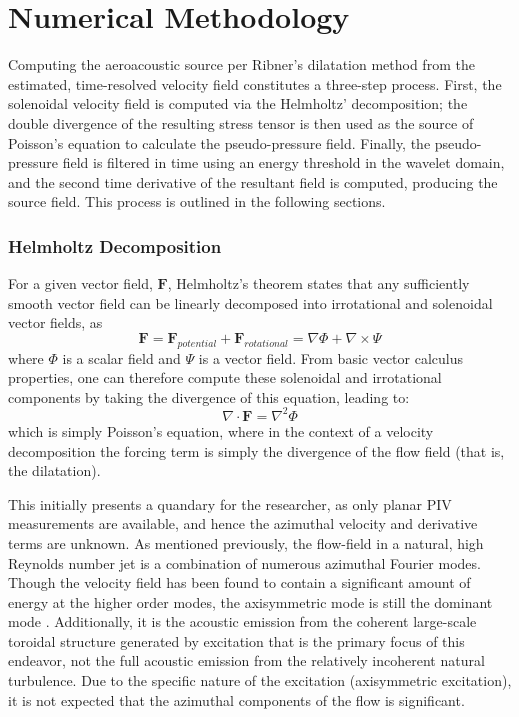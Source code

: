 \section{Numerical Methodology}
Computing the aeroacoustic source per Ribner's dilatation method from the estimated, time-resolved velocity field constitutes a three-step process. 
First, the solenoidal velocity field is computed via the Helmholtz' decomposition; the double divergence of the resulting stress tensor is then used as the source of Poisson's equation to calculate the pseudo-pressure field. 
Finally, the pseudo-pressure field is filtered in time using an energy threshold in the wavelet domain, and the second time derivative of the resultant field is computed, producing the source field.
This process is outlined in the following sections.
\subsubsection{Helmholtz Decomposition}
For a given vector field, $\mathbf{F}$, Helmholtz's theorem states that any sufficiently smooth vector field can be linearly decomposed into irrotational and solenoidal vector fields, as
\begin{equation}
\mathbf{F} = \mathbf{F}_{potential} + \mathbf{F}_{rotational} = \nabla \Phi + \nabla \times \Psi
\end{equation}
where $\Phi$ is a scalar field and $\Psi$ is a vector field.
From basic vector calculus properties, one can therefore compute these solenoidal and irrotational components by taking the divergence of this equation, leading to:
\begin{equation}
\nabla \cdot \mathbf{F} = \nabla^{2} \Phi
\end{equation}
which is simply Poisson's equation, where in the context of a velocity decomposition the forcing term is simply the divergence of the flow field (that is, the dilatation).

This initially presents a quandary for the researcher, as only planar PIV measurements are available, and hence the azimuthal velocity and derivative terms are unknown.
As mentioned previously, the flow-field in a natural, high Reynolds number jet is a combination of numerous azimuthal Fourier modes.
Though the velocity field has been found to contain a significant amount of energy at the higher order modes, the axisymmetric mode is still the dominant mode \citep{Glauser1987}.
Additionally, it is the acoustic emission from the coherent large-scale toroidal structure generated by excitation that is the primary focus of this endeavor, not the full acoustic emission from the relatively incoherent natural turbulence.
Due to the specific nature of the excitation (axisymmetric excitation), it is not expected that the azimuthal components of the flow is significant.

